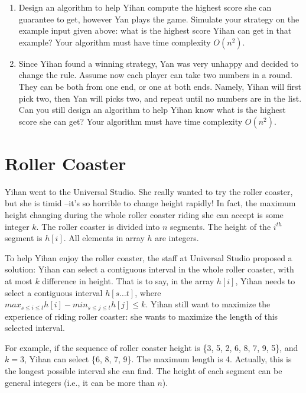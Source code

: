 \documentclass[11pt]{article}
\begin{document}
\begin{tcolorbox}[title=Exercises]
    \begin{enumerate}
        \item Design an algorithm to help Yihan compute the highest score she can guarantee to get, however Yan plays the game. Simulate your strategy on the example input given above: what is the highest score Yihan can get in that example? Your algorithm must have time complexity $O(n^2)$.
        \item Since Yihan found a winning strategy, Yan was very unhappy and decided to change the rule.  Assume now each player can take two numbers in a round. They can be both from one end, or one at both ends. Namely, Yihan will first pick two, then Yan will picks two, and repeat until no numbers are in the list. Can you still design an algorithm to help Yihan know what is the highest score she can get? Your algorithm must have time complexity $O(n^2)$.
    \end{enumerate}
\end{tcolorbox}

\section{Roller Coaster}
Yihan went to the Universal Studio. She really wanted to try the roller coaster, but she is timid --it's so horrible to change height rapidly! In fact, the maximum height changing during the whole roller coaster riding she can accept is some integer $k$. The roller coaster is divided into $n$ segments. The height of the $i^{th}$ segment is $h[i]$. All elements in array $h$ are integers.

To help Yihan enjoy the roller coaster, the staff at Universal Studio proposed a solution: Yihan can select a contiguous interval in the whole roller coaster, with at most $k$ difference in height. That is to say, in the array $h[i]$, Yihan needs to select a contiguous interval $h[s \ldots t]$, where $max_{s \leq i \leq t} h[i] - min_{s \leq j \leq t} h[j] \leq k$.  Yihan still want to maximize the experience of riding roller coaster: she wants to maximize the length of this selected interval.

For example, if the sequence of roller coaster height is \{3, 5, 2, 6, 8, 7, 9, 5\}, and $k = 3$, Yihan can select \{6, 8, 7, 9\}. The maximum length is 4. Actually, this is the longest possible interval she can find. The height of each segment can be general integers (i.e., it can be more than $n$).
\end{document}
